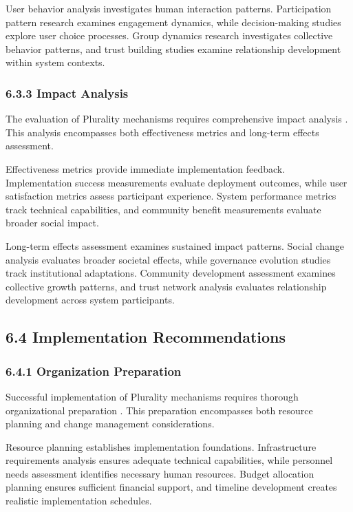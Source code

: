 User behavior analysis investigates human interaction patterns. Participation pattern research examines engagement dynamics, while decision-making studies explore user choice processes. Group dynamics research investigates collective behavior patterns, and trust building studies examine relationship development within system contexts.

\hypertarget{impact-analysis}{%
\subsubsection{6.3.3 Impact Analysis}\label{impact-analysis}}

The evaluation of Plurality mechanisms requires comprehensive impact analysis \citep{vtaiwan2023}. This analysis encompasses both effectiveness metrics and long-term effects assessment.

Effectiveness metrics provide immediate implementation feedback. Implementation success measurements evaluate deployment outcomes, while user satisfaction metrics assess participant experience. System performance metrics track technical capabilities, and community benefit measurements evaluate broader social impact.

Long-term effects assessment examines sustained impact patterns. Social change analysis evaluates broader societal effects, while governance evolution studies track institutional adaptations. Community development assessment examines collective growth patterns, and trust network analysis evaluates relationship development across system participants.

\hypertarget{implementation-recommendations}{%
\subsection{6.4 Implementation Recommendations}\label{implementation-recommendations}}

\hypertarget{organization-preparation}{%
\subsubsection{6.4.1 Organization Preparation}\label{organization-preparation}}

Successful implementation of Plurality mechanisms requires thorough organizational preparation \citep{pdis2024}. This preparation encompasses both resource planning and change management considerations.

Resource planning establishes implementation foundations. Infrastructure requirements analysis ensures adequate technical capabilities, while personnel needs assessment identifies necessary human resources. Budget allocation planning ensures sufficient financial support, and timeline development creates realistic implementation schedules.

